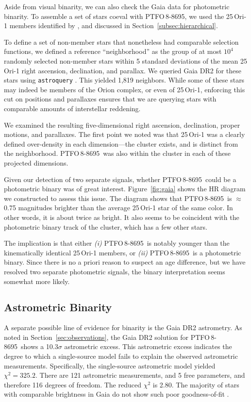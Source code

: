\documentclass[12pt,twocolumn,tighten]{aastex62}
\newcommand{\ptfo}{PTFO$\,$8-8695}
\begin{document}
Aside from visual binarity, we can also check the Gaia data for
photometric binarity.  To assemble a set of stars coeval with \ptfo,
we used the 25$\,$Ori-1 members identified by
\citet{kounkel_apogee2_2018}, and discussed in
Section~\ref{subsec:hierarchical}.

To define a set of non-member stars that nonetheless had comparable
selection functions, we defined a reference ``neighborhood'' as the
group of at most $10^4$ randomly selected non-member stars within 5
standard deviations of the mean 25$\,$Ori-1 right ascension,
declination, and parallax.  We queried Gaia DR2 for these stars using
\texttt{astroquery} \citep{astroquery_2018}.  This yielded 1{,}819
neighbors.  While some of these stars may indeed be members of the
Orion complex, or even of 25$\,$Ori-1, enforcing this cut on positions
and parallaxes ensures that we are querying stars with comparable
amounts of interstellar reddening.

We examined the resulting five-dimensional right ascension,
declination, proper motions, and parallaxes.  The first point we noted
was that 25$\,$Ori-1 was a clearly defined over-density in each
dimension---the cluster exists, and is distinct from the neighborhood.
\ptfo\ was also within the cluster in each of these projected
dimensions.

Given our detection of two separate signals, whether \ptfo\ could be a
photometric binary was of great interest.  Figure~\ref{fig:gaia} shows
the HR diagram we constructed to assess this issue.  The diagram shows
that \ptfo\ is $\approx$0.75 magnitudes brighter than the average
25$\,$Ori-1 star of the same color.  In other words, it is about twice
as bright.  It also seems to be coincident with the photometric binary
track of the cluster, which has a few other stars.

The implication is that either {\it (i)} \ptfo\ is notably younger
than the kinematically identical 25$\,$Ori-1 members, or {\it (ii)}
\ptfo\ is a photometric binary.  Since there is no a priori reason to
suspect an age difference, but we have resolved two separate
photometric signals, the binary interpretation seems somewhat more
likely.


\subsection{Astrometric Binarity}

A separate possible line of evidence for binarity is the Gaia DR2
astrometry.  As noted in Section~\ref{sec:observations}, the Gaia DR2
solution for \ptfo\ shows a 10.3$\sigma$ astrometric excess.  This
astrometric excess indicates the degree to which a single-source model
fails to explain the observed astrometric measurements.  Specifically,
the single-source astrometric model yielded $\chi^2=325.2$.  There are
121 astrometric measurements, and 5 free parameters, and therefore 116
degrees of freedom. The reduced $\chi^2$ is 2.80.  The majority of
stars with comparable brightness in Gaia do not show such poor
goodness-of-fit \citep[see][Appendix A]{lindegren_gaiasoln_2018}.
\end{document}
